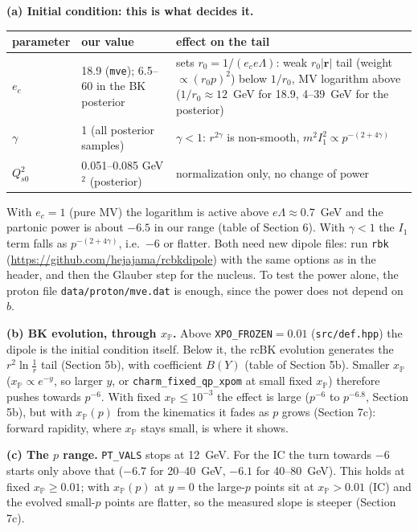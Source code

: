 \documentclass[12pt]{article}
\begin{document}
\textbf{(a) Initial condition: this is what decides it.}
\begin{center}
\begin{tabular}{lp{}p{}}
\toprule
parameter & our value & effect on the tail \\
\midrule
$e_c$ & 18.9 (\texttt{mve}); 6.5--60 in the BK posterior & sets $r_0=1/(e_ce\Lambda)$: weak $r_0|\mathbf r|$
tail (weight $\propto(r_0p)^2$) below $1/r_0$, MV logarithm above ($1/r_0\approx12$~GeV for 18.9, 4--39~GeV
for the posterior) \\
$\gamma$ & 1 (all posterior samples) & $\gamma<1$: $r^{2\gamma}$ is non-smooth,
$m^2I_1^2\propto p^{-(2+4\gamma)}$ \\
$Q_{s0}^2$ & 0.051--0.085 GeV$^2$ (posterior) & normalization only, no change of power \\
\bottomrule
\end{tabular}
\end{center}
With $e_c=1$ (pure MV) the logarithm is active above $e\Lambda\approx0.7$~GeV and the partonic power is
about $-6.5$ in our range (table of Section 6). With $\gamma<1$ the $I_1$ term falls as $p^{-(2+4\gamma)}$,
i.e.\ $-6$ or flatter. Both need new dipole files: run \texttt{rbk}
(\url{https://github.com/hejajama/rcbkdipole}) with the same options as in the header, and then the
Glauber step for the nucleus. To test the power alone, the proton file \texttt{data/proton/mve.dat} is
enough, since the power does not depend on $b$.

\textbf{(b) BK evolution, through $x_{\mathbb P}$.} Above \texttt{XPO\_FROZEN}$=0.01$
(\texttt{src/def.hpp}) the dipole is the initial condition itself. Below it, the rcBK evolution generates the
$r^2\ln\frac1r$ tail (Section 5b), with coefficient $B(Y)$ (table of Section 5b). Smaller $x_{\mathbb P}$
($x_{\mathbb P}\propto e^{-y}$, so larger $y$, or
\texttt{charm\_fixed\_qp\_xpom} at small fixed $x_{\mathbb P}$) therefore pushes towards $p^{-6}$. With
fixed $x_{\mathbb P}\le10^{-3}$ the effect is large ($p^{-6}$ to $p^{-6.8}$, Section 5b), but with
$x_{\mathbb P}(p)$ from the kinematics it fades as $p$ grows (Section 7c): forward rapidity, where
$x_{\mathbb P}$ stays small, is where it shows.

\textbf{(c) The $p$ range.} \texttt{PT\_VALS} stops at 12~GeV. For the IC the turn towards $-6$ starts only
above that ($-6.7$ for 20--40~GeV, $-6.1$ for 40--80~GeV). This holds at fixed $x_{\mathbb P}\ge0.01$; with
$x_{\mathbb P}(p)$ at $y=0$ the large-$p$ points sit at $x_{\mathbb P}>0.01$ (IC) and the evolved
small-$p$ points are flatter, so the measured slope is steeper (Section 7c).
\end{document}

